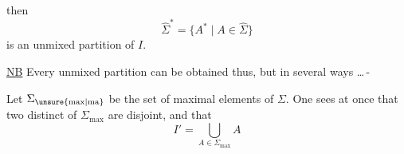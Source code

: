 then \[ \hat{\Sigma}^{\ast}=\{A^{\ast}\mid A\in\hat{\Sigma}\} \] is an unmixed partition of $I$.

\uline{NB} Every unmixed partition can be obtained thus, but in several ways \ldots\,­-

Let $\Sigma_{\unsure{\mathrm{max}|\mathrm{ma}}}$ be the set of maximal elements of $\Sigma$. One sees at once that two distinct  of $\Sigma_{\mathrm{max}}$ are disjoint, and that \[ I'=\bigcup_{A\in\Sigma_{\mathrm{max}}}A \]
